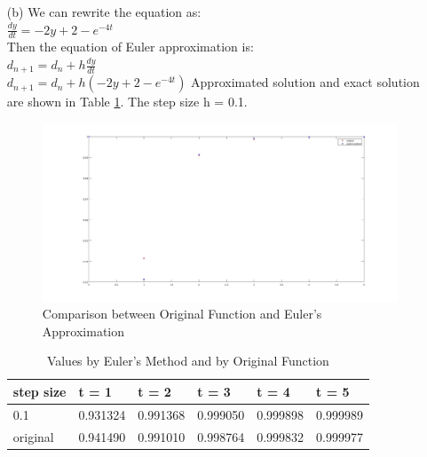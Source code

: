 \documentclass[11pt]{article}
\begin{document}
\begin{enumerate}
\begin{enumerate}
	\item[(b)] We can rewrite the equation as: \\
	\newline
	$\frac{dy}{dt}=-2y+2-e^{-4t}$\\
	\newline
	Then the equation of Euler approximation is:\\
	\newline
	$d_{n+1}=d_{n}+h\frac{dy}{dt}$\\
	$d_{n+1}=d_{n}+h(-2y+2-e^{-4t})$
	\newline
	Approximated solution and exact solution are shown in Table \ref{tab:table1}. The step size h = 0.1.
	\begin{figure}[H]
		\includegraphics[width=1.2\textwidth]{./code/1_b}
		\caption{Comparison between Original Function and Euler's Approximation}
		\label{fig:b}
	\end{figure}
	\begin{table}[h!]
		\begin{center}
			
			\label{tab:table1}
			\begin{tabular}{llllll} %
				\textbf{step size} & \textbf{t = 1} & \textbf{t = 2}& \textbf{t = 3}& \textbf{t = 4}& \textbf{t = 5}\\
				\hline
				0.1 & 0.931324 & 0.991368 & 0.999050 & 0.999898 & 0.999989\\
				\hline
				original & 0.941490 & 0.991010 & 0.998764 & 0.999832 & 0.999977\\ 
				\hline
			\end{tabular}
			\caption{Values by Euler's Method and by Original Function}
		\end{center}
	\end{table}
	

\end{enumerate}
\end{enumerate}
\end{document}
